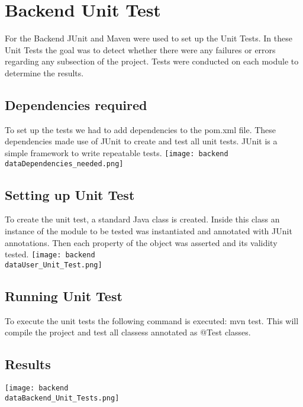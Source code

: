 \section{Backend Unit Test}
For the Backend JUnit and Maven were used to set up the Unit Tests. In these Unit Tests the goal was to detect whether there were any failures or errors regarding any subsection of the project.
Tests were conducted on each module to determine the results.

\subsection{Dependencies required}
To set up the tests we had to add dependencies to the pom.xml file. These dependencies made use of JUnit to create and test all unit tests.
JUnit is a simple framework to write repeatable tests.
\texttt{[image: backend\\dataDependencies\_needed.png]}

\subsection{Setting up Unit Test}
To create the unit test, a standard Java class is created. Inside this class an instance of the module to be tested was instantiated and annotated with JUnit annotations.
Then each property of the object was asserted and its validity tested.
\texttt{[image: backend\\dataUser\_Unit\_Test.png]}

\subsection{Running Unit Test}
To execute the unit tests the following command is executed: mvn test. This will compile the project and test all classess annotated as @Test classes.

\subsection{Results}
\texttt{[image: backend\\dataBackend\_Unit\_Tests.png]}